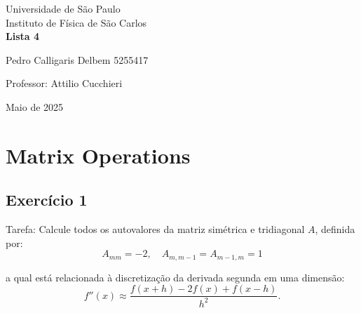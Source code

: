 \documentclass[12pt, a4paper]{article} %
\begin{document}
	
	\begin{titlepage}
		\begin{center}
\Huge{Universidade de São Paulo}\\
\large{Instituto de Física de São Carlos}\\
\vspace{20pt}
\vspace{200pt}
\textbf{Lista 4}\\
\vspace{8cm}
		\end{center}

\begin{flushleft}
\begin{tabbing}
Pedro Calligaris Delbem 5255417\\
\end{tabbing}
\vspace{0.5cm}
Professor: Attilio Cucchieri\\		
		\end{flushleft}
	
		\begin{center}
			\vspace{\fill}
	Maio de 2025	
		\end{center}
	\end{titlepage}

	\tableofcontents 
	\thispagestyle{empty}
	\newpage

\section{Matrix Operations}

    \subsection{Exerc\'icio 1}

        Tarefa: Calcule todos os autovalores da matriz sim\'etrica e tridiagonal $A$, definida por:
        \begin{equation*}
            A_{mm} = -2, \quad A_{m,m-1} = A_{m-1,m} = 1
        \end{equation*}

        a qual est\'a relacionada \`a discretiza\c{c}\~ao da derivada segunda em uma dimens\~ao:
        \begin{equation*}
            f''(x) \approx \frac{f(x + h) - 2f(x) + f(x - h)}{h^2}.
        \end{equation*}
        
\end{document}
